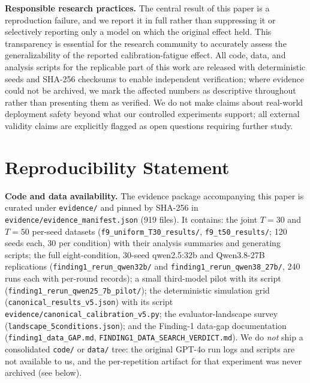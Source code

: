 \documentclass[11pt]{article}
\theoremstyle{definition}
\theoremstyle{remark}
\begin{document}
\textbf{Responsible research practices.} The central result of this paper is a reproduction failure, and we report it in full rather than suppressing it or selectively reporting only a model on which the original effect held. This transparency is essential for the research community to accurately assess the generalizability of the reported calibration-fatigue effect. All code, data, and analysis scripts for the replicable part of this work are released with deterministic seeds and SHA-256 checksums to enable independent verification; where evidence could not be archived, we mark the affected numbers as descriptive throughout rather than presenting them as verified. We do not make claims about real-world deployment safety beyond what our controlled experiments support; all external validity claims are explicitly flagged as open questions requiring further study.

\section*{Reproducibility Statement}

\textbf{Code and data availability.} The evidence package accompanying this paper is curated under \texttt{evidence/} and pinned by SHA-256 in \texttt{evidence/evidence\_manifest.json} (919 files). It contains: the joint $T{=}30$ and $T{=}50$ per-seed datasets (\texttt{f9\_uniform\_T30\_results/}, \texttt{f9\_t50\_results/}; 120 seeds each, 30 per condition) with their analysis summaries and generating scripts; the full eight-condition, 30-seed qwen2.5:32b and Qwen3.8-27B replications (\texttt{finding1\_rerun\_qwen32b/} and \texttt{finding1\_rerun\_qwen38\_27b/}, 240 runs each with per-round records); a small third-model pilot with its script (\texttt{finding1\_rerun\_qwen25\_7b\_pilot/}); the deterministic simulation grid (\texttt{canonical\_results\_v5.json}) with its script \texttt{evidence/canonical\_calibration\_v5.py}; the evaluator-landscape survey (\texttt{landscape\_5conditions.json}); and the Finding-1 data-gap documentation (\texttt{finding1\_data\_GAP.md}, \texttt{FINDING1\_DATA\_SEARCH\_VERDICT.md}). We do \emph{not} ship a consolidated \texttt{code/} or \texttt{data/} tree: the original GPT-4o run logs and scripts are not available to us, and the per-repetition artifact for that experiment was never archived (see below).
\end{document}
